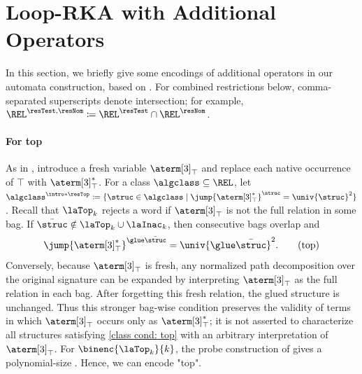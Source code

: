 \documentclass[10pt,a4paper]{article}
\theoremstyle{definition}
\theoremstyle{remark}
\DeclarePairedDelimiter\set{\{}{\}}
\newcommand{\defeq}{\coloneq}
\newcommand{\mul}[1]{\bar{#1}}
\begin{document}
\section{Loop-RKA with Additional Operators}\label{section: encoding extras}
In this section,
we briefly give some encodings of additional operators in our automata construction, based on \cite{nakamuraDerivativesGraphsPositive2025}.
For combined restrictions below, comma-separated superscripts denote intersection; for example,
$\REL^{\resTest,\resNom}\defeq\REL^{\resTest}\cap\REL^{\resNom}$.
\paragraph*{For top}
As in , introduce a fresh variable $\aterm[3]_{\top}$
and replace each native occurrence of $\top$ with $\aterm[3]_{\top}^{*}$.
For a class $\algclass\subseteq\REL$, let
$\algclass^{\intro*\resTop}\defeq
\set{\struc\in\algclass\mid \jump{\aterm[3]_{\top}^{*}}^{\struc}=\univ{\struc}^{2}}$.
Recall that $\laTop_k$ rejects a word if $\aterm[3]_{\top}$ is not the full relation in some bag.
If $\mul{\struc} \notin \laTop_k \cup \laInac_k$, then consecutive bags overlap and
\[
\jump{\aterm[3]_{\top}^{*}}^{\glue\mul{\struc}}=\univ{\glue\mul{\struc}}^2.
\tag{top}\label{class cond: top}
\]
Conversely, because $\aterm[3]_{\top}$ is fresh, any normalized path decomposition over the original signature
can be expanded by interpreting $\aterm[3]_{\top}$ as the full relation in each bag.
After forgetting this fresh relation, the glued structure is unchanged.
Thus this stronger bag-wise condition preserves the validity of terms in which $\aterm[3]_{\top}$ occurs only as $\aterm[3]_{\top}^{*}$;
it is not asserted to characterize all structures satisfying \eqref{class cond: top} with an arbitrary interpretation of $\aterm[3]_{\top}$.
For $\binenc{\laTop_{k}}{k}$, the probe construction of
 gives a polynomial-size .
Hence, we can encode "top".

%
%
%
%
\end{document}
